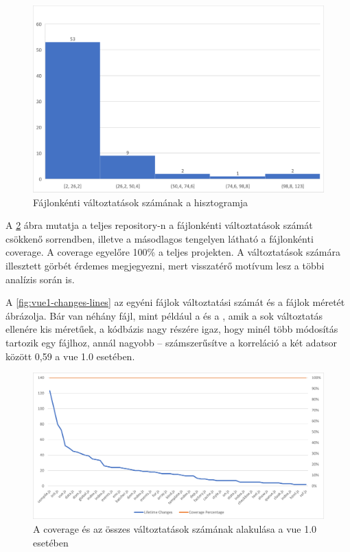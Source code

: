\begin{figure}[h]
    \centering
    \includegraphics[width=1\textwidth]{images/vue/vue1-hist.png}
    \caption{Fájlonkénti változtatások számának a hisztogramja}
    \label{fig:vue1-hist}
\end{figure}

A \ref{fig:vue1-cov-changes} ábra mutatja a teljes repository-n a fájlonkénti változtatások számát csökkenő sorrendben, illetve a másodlagos tengelyen látható a fájlonkénti coverage. A coverage egyelőre 100\% a teljes projekten. A változtatások számára illesztett görbét érdemes megjegyezni, mert visszatérő motívum lesz a többi analízis során is.

A \ref{fig:vue1-changes-lines} az egyéni fájlok változtatási számát és a fájlok méretét ábrázolja. Bár van néhány fájl, mint például a  és a , amik a sok változtatás ellenére kis méretűek, a kódbázis nagy részére igaz, hogy minél több módosítás tartozik egy fájlhoz, annál nagyobb -- számszerűsítve a korreláció a két adatsor között 0,59 a vue 1.0 esetében.

\begin{figure}[H]
    \centering
    \includegraphics[width=1\textwidth]{images/vue/vue1-lifetime-changes.png}
    \caption{A coverage és az összes változtatások számának alakulása a vue 1.0 esetében}
    \label{fig:vue1-cov-changes}
\end{figure}

